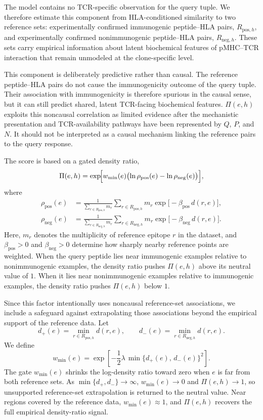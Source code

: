 \documentclass[11pt]{article}
\begin{document}
The model contains no TCR-specific observation for the query tuple. We
therefore estimate this component from HLA-conditioned similarity to two
reference sets: experimentally confirmed immunogenic peptide--HLA pairs,
\(R_{\mathrm{pos},h}\), and experimentally confirmed nonimmunogenic peptide--HLA
pairs, \(R_{\mathrm{neg},h}\). These sets carry empirical information about latent
biochemical features of pMHC--TCR interaction that remain unmodeled at the
clone-specific level.

This component is deliberately predictive rather than causal. The reference
peptide--HLA pairs do not cause the immunogenicity outcome of the query tuple.
Their association with immunogenicity is therefore spurious in the causal
sense, but it can still predict shared, latent TCR-facing biochemical features.
\(\Pi(e,h)\) exploits this noncausal correlation as limited evidence after the
mechanistic presentation and TCR-availability pathways have been represented by
\(Q\), \(P\), and \(N\). It should not be interpreted as a causal mechanism linking
the reference pairs to the query response.

The score is based on a gated density ratio,
\begin{equation}
\Pi(e,h)
= \exp\!\Bigl[
w_{\min}(e)
\bigl(
\ln \rho_{\mathrm{pos}}(e)
-
\ln \rho_{\mathrm{neg}}(e)
\bigr)
\Bigr],
\end{equation}
where
\[
\begin{aligned}
\rho_{\mathrm{pos}}(e)
&=
\frac{1}{\sum_{r\in R_{\mathrm{pos},h}} m_r}
\sum_{r\in R_{\mathrm{pos},h}}
m_r \exp\!\bigl[-\beta_{\mathrm{pos}}\,d(r,e)\bigr],\\
\rho_{\mathrm{neg}}(e)
&=
\frac{1}{\sum_{r\in R_{\mathrm{neg},h}} m_r}
\sum_{r\in R_{\mathrm{neg},h}}
m_r \exp\!\bigl[-\beta_{\mathrm{neg}}\,d(r,e)\bigr].
\end{aligned}
\]
Here, \(m_r\) denotes the multiplicity of reference epitope \(r\) in the dataset, and \(\beta_{\mathrm{pos}}>0\) and \(\beta_{\mathrm{neg}}>0\) determine how sharply nearby reference points are weighted. When the query peptide lies near immunogenic examples relative to nonimmunogenic examples, the density ratio pushes \(\Pi(e,h)\) above its neutral value of \(1\). When it lies near nonimmunogenic examples relative to immunogenic examples, the density ratio pushes \(\Pi(e,h)\) below \(1\).

Since this factor intentionally uses noncausal reference-set associations, we include a safeguard against extrapolating those associations beyond the empirical support of the reference data. Let
\[
d_{+}(e)=\min_{r\in R_{\mathrm{pos},h}}d(r,e),
\qquad
d_{-}(e)=\min_{r\in R_{\mathrm{neg},h}}d(r,e).
\]
We define
\[
w_{\min}(e)
=
\exp\!\left[
-\frac{1}{2}\lambda\,\min\{d_{+}(e),\,d_{-}(e)\}^{2}
\right].
\]
The gate \(w_{\min}(e)\) shrinks the log-density ratio toward zero when \(e\) is far from both reference sets. As \(\min\{d_{+},d_{-}\}\to\infty\), \(w_{\min}(e)\to0\) and \(\Pi(e,h)\to1\), so unsupported reference-set extrapolation is returned to the neutral value. Near regions covered by the reference data, \(w_{\min}(e)\approx1\), and \(\Pi(e,h)\) recovers the full empirical density-ratio signal.
\end{document}
